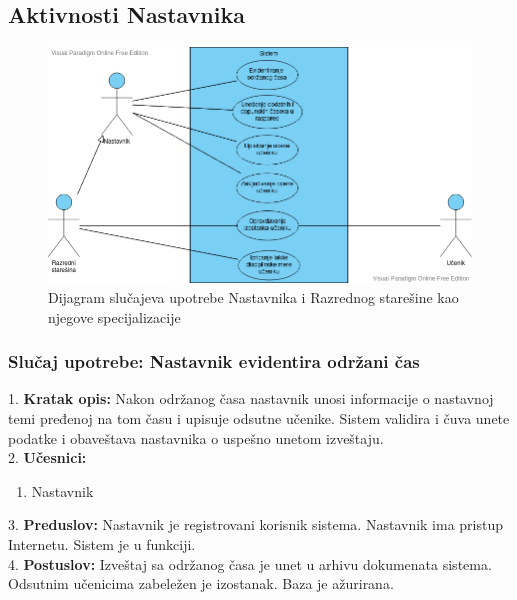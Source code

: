 \documentclass{article}
\begin{document}
\subsection{Aktivnosti Nastavnika}

\begin{figure} [!ht]
    \begin{center}
        \includegraphics[scale=0.45]{imgs/nastavnik_use_case.png}
    \end{center}
\caption{Dijagram slučajeva upotrebe Nastavnika i Razrednog starešine kao njegove specijalizacije}
\end{figure}

\newpage
\subsubsection{Slučaj upotrebe: Nastavnik evidentira održani čas} 
1. \textbf{Kratak opis:} Nakon održanog časa nastavnik unosi informacije o nastavnoj temi pređenoj na tom času i upisuje odsutne učenike. Sistem validira i čuva unete podatke i obaveštava nastavnika o uspešno unetom izveštaju.\\

2. \textbf{Učesnici:}
\begin{enumerate} [label=(\alph*)]
\item Nastavnik
\end{enumerate} 

3. \textbf{Preduslov:} Nastavnik je registrovani korisnik sistema. Nastavnik ima pristup Internetu. Sistem je u funkciji. \\

4. \textbf{Postuslov:} Izveštaj sa održanog časa je unet u arhivu dokumenata sistema. Odsutnim učenicima zabeležen je izostanak. Baza je ažurirana. \\
\end{document}
